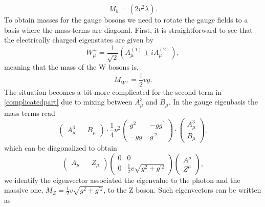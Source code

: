 %
\begin{equation}\label{eq:Higgs_mass}
M_h= (2v^2 \lambda).  
\end{equation}
%
To obtain masses for the gauge bosons we need to rotate the gauge fields to a basis where the mass terms are diagonal. First, it is straightforward to see that the electrically charged eigenstates are given by %
\begin{equation}
W^\pm_\mu = \frac{1}{\sqrt{2}} (A^{(1)}_\mu \pm i A^{(2)}_\mu), 
\label{gagestate}
\end{equation}
meaning that the mass of the W bosons is, 
\begin{equation}
M_{W^\pm}= \frac{1}{2} v g.
\end{equation}
%
The situation becomes a bit more complicated for the second term in \eqref{complicatedpart} due to  mixing between $A_\mu^3$ and $B_\mu$. In the gauge eigenbasis the mass terms read
%
\begin{equation}\label{eq:Mass_matrix_diag_1}
\begin{pmatrix}
A_\mu^3 && B_\mu
\end{pmatrix} \cdot  \frac{1}{4} \nu ^2 \begin{pmatrix}
g^2  & -g g^\prime \\
-g g^\prime & g^{\prime 2} 
\end{pmatrix} \cdot \begin{pmatrix}
A_\mu^3 \\  B_\mu
\end{pmatrix}, 
\end{equation} 
%
which can be diagonalized to obtain
%
\begin{equation}\label{eq:Mass_matrix_diag_2}
\begin{pmatrix}
A_\mu && Z_\mu 
\end{pmatrix} \begin{pmatrix}
0  & 0 \\
0  & \frac{1}{2} v \sqrt{g^2 + g^{\prime 2}} 
\end{pmatrix}  \begin{pmatrix}
A^\mu \\ Z^\mu
\end{pmatrix}, 
\end{equation}
%
 we identify the eigenvector associated  the  eigenvalue  to  the photon and the massive one, $ M_Z =  \frac{1}{2} v \sqrt{g^2 + g^{\prime 2}} $, to  the Z boson. Such eigenvectors can be written as
